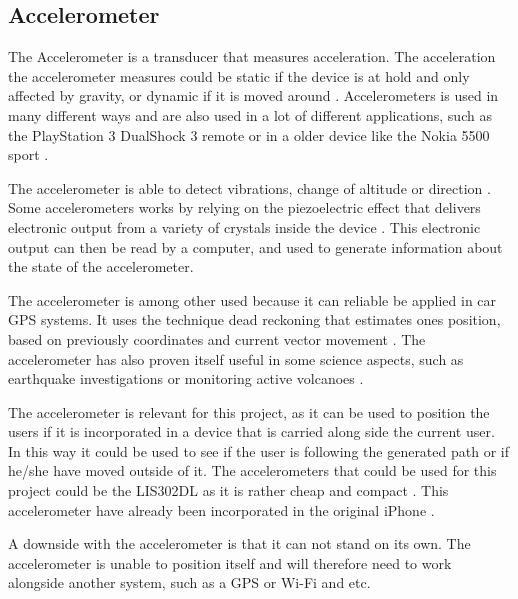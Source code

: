 \subsection{Accelerometer}\label{subs_acel}

The Accelerometer is a transducer that measures acceleration. The acceleration the accelerometer measures could be static if the device is at hold and only affected by gravity, or dynamic if it is moved around \cite{acc_engi}. Accelerometers is used in many different ways and are also used in a lot of different applications, such as the PlayStation 3 DualShock 3 remote \cite{acc_ps3} or in a older device like the Nokia 5500 sport \cite{acc_nokia}.


The accelerometer is able to detect vibrations, change of altitude or direction \cite{acc_engi}. Some accelerometers works by relying on the piezoelectric effect that delivers electronic output from a variety of crystals inside the device \cite{acc_piezo}. This electronic output can then be read by a computer, and used to generate information about the state of the accelerometer.


The accelerometer is among other used because it can reliable be applied in car GPS systems. It uses the technique dead reckoning that estimates ones position, based on previously coordinates and current vector movement \cite{acc_dead}. The accelerometer has also proven itself useful in some science aspects, such as earthquake investigations or monitoring active volcanoes \cite{acc_vulkan}. 


The accelerometer is relevant for this project, as it can be used to position the users if it is incorporated in a device that is carried along side the current user. In this way it could be used to see if the user is following the generated path or if he/she have moved outside of it. The accelerometers that could be used for this project could be the LIS302DL as it is rather cheap and compact \cite{acc_price,acc_lis302dl}. This accelerometer have already been incorporated in the original iPhone \cite{acc_iPhone}.


A downside with the accelerometer is that it can not stand on its own. The accelerometer is unable to position itself and will therefore need to work alongside another system, such as a GPS or Wi-Fi and etc. 
